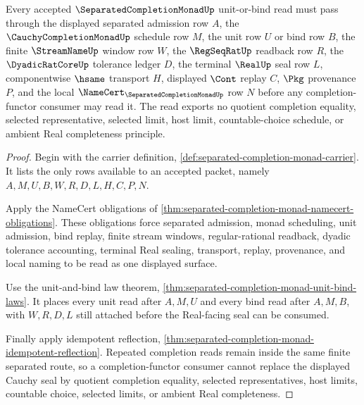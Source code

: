 \begin{theorem}
\label{thm:completion-monad-cauchy-seal}
Every accepted $\SeparatedCompletionMonadUp$ unit-or-bind read must pass through the displayed separated admission row $A$, the $\CauchyCompletionMonadUp$ schedule row $M$, the unit row $U$ or bind row $B$, the finite $\StreamNameUp$ window row $W$, the $\RegSeqRatUp$ readback row $R$, the $\DyadicRatCoreUp$ tolerance ledger $D$, the terminal $\RealUp$ seal row $L$, componentwise $\hsame$ transport $H$, displayed $\Cont$ replay $C$, $\Pkg$ provenance $P$, and the local $\NameCert_{\SeparatedCompletionMonadUp}$ row $N$ before any completion-functor consumer may read it. The read exports no quotient completion equality, selected representative, selected limit, host limit, countable-choice schedule, or ambient Real completeness principle.
\end{theorem}
\begin{proof}
Begin with the carrier definition, \autoref{def:separated-completion-monad-carrier}. It lists the only rows available to an accepted packet, namely $A,M,U,B,W,R,D,L,H,C,P,N$.

Apply the NameCert obligations of \autoref{thm:separated-completion-monad-namecert-obligations}. These obligations force separated admission, monad scheduling, unit admission, bind replay, finite stream windows, regular-rational readback, dyadic tolerance accounting, terminal Real sealing, transport, replay, provenance, and local naming to be read as one displayed surface.

Use the unit-and-bind law theorem, \autoref{thm:separated-completion-monad-unit-bind-laws}. It places every unit read after $A,M,U$ and every bind read after $A,M,B$, with $W,R,D,L$ still attached before the Real-facing seal can be consumed.

Finally apply idempotent reflection, \autoref{thm:separated-completion-monad-idempotent-reflection}. Repeated completion reads remain inside the same finite separated route, so a completion-functor consumer cannot replace the displayed Cauchy seal by quotient completion equality, selected representatives, host limits, countable choice, selected limits, or ambient Real completeness.
\end{proof}


